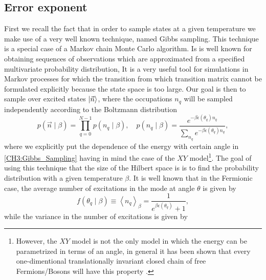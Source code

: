 \subsection{Error exponent}

First we recall the fact that in order to sample states at a given temperature we make use of a very well known technique, named Gibbs sampling. This technique is a special case of a Markov chain Monte Carlo algorithm. Is is well known for obtaining sequences of observations which are approximated from a specified multivariate probability distribution, It is a very useful tool for simulations in Markov processes for which the transition from which transition matrix cannot be formulated explicitly because the state space is too large\cite{robert_multi-stage_2004,gilks_markov_1996,noauthor_gibbs_nodate}. Our goal is then to sample over excited states $\mathinner{|{\vec{n}}\rangle}$, where the occupations $n_q$ will be sampled independently according to the Boltzmann distribution
\begin{equation}
p(\vec{n} \mid \beta)=\prod_{q=0}^{N-1} p\left(n_{q} \mid \beta\right), \quad p\left(n_{q} \mid \beta\right)=\frac{e^{-\beta \epsilon\left(\theta_{q}\right) n_{q}}}{\sum_{n_{q}} e^{-\beta \epsilon\left(\theta_{q}\right) n_{q}}},
\label{CH3:Gibbs_Sampling}
\end{equation}
where we explicitly put the dependence of the energy with certain angle in \eqref{CH3:Gibbs_Sampling} having in mind the case of the $XY$ model\footnote{However, the $XY$ model is not the only model in which the energy can be parametrized in terms of an angle, in general it has been shown that every one-dimentional translationally invariant closed chain of free Fermions/Bosons will have this property \cite{eisert_area_2010,fradkin_field_1997,katsura_statistical_1962,latorre_ground_2004,lieb_two_1961}.}. The goal of using this technique  that the size of the Hilbert space is is to find the probability distribution with a given temperature $\beta$. It is well known that in the Fermionic case, the average number of excitations in the mode at angle $\theta$ is given by
\begin{equation}
f\left(\theta_{q} \mid \beta\right) \equiv\left\langle n_{q}\right\rangle_{\beta}=\frac{1}{e^{\beta \epsilon\left(\theta_{q}\right)} + 1},
\end{equation}
while the variance in the number of excitations is given by

